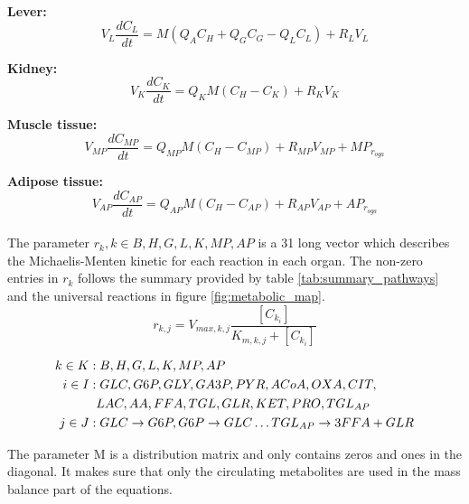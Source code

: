 \documentclass{IEEEtran}
\begin{document}
\textbf{Lever:}
\begin{equation}
    V_{L}  \frac{dC_{L}}{dt} = M (Q_{A} C_H + Q_{G} C_G - Q_{L} C_L) + R_L V_L
\end{equation}

\textbf{Kidney:}
\begin{equation}
    V_{K}  \frac{dC_{K}}{dt} = Q_{K} M (C_H - C_K) + R_K V_K
\end{equation}

\textbf{Muscle tissue:}
\begin{equation}
    V_{MP}  \frac{dC_{MP}}{dt} = Q_{MP} M (C_H - C_{MP}) + R_{ MP}V_{MP} + MP_{r_{oga}} 
\end{equation}

\textbf{Adipose tissue:}
\begin{equation}
    V_{AP}  \frac{dC_{AP}}{dt} = Q_{AP} M (C_H - C_{AP}) + R_{ AP}V_{AP} + AP_{r_{oga}} 
\end{equation} \\


The parameter $r_k , k \in {B,H,G,L,K,MP,AP}$ is a 31 long vector which describes the Michaelis-Menten kinetic for each reaction in each organ. The non-zero entries in $r_k$ follows the summary provided by table \ref{tab:summary_pathways} and the universal reactions in figure \ref{fig:metabolic_map}. \\

\begin{equation}
    r_{k,j} = V_{max,k,j} \frac{[C_{k_i}]}{K_{m,k,j}+[C_{k_i}]} 
\end{equation}


\begin{align*}
k \in K: &\hspace{1mm} B,H,G,L,K,MP,AP \\
i \in I: &\hspace{1mm} GLC,G6P,GLY,GA3P,PYR,ACoA,OXA,CIT, \\
        & LAC,AA,FFA,TGL,GLR,KET,PRO,TGL_{AP}     \\
j \in J: &\hspace{1mm}
GLC\rightarrow G6P, G6P\rightarrow GLC \ldots TGL_{AP} \rightarrow 3FFA + GLR 
\end{align*}


The parameter M is a distribution matrix and only contains zeros and ones in the diagonal. It makes sure that only the circulating metabolites are used in the mass balance part of the equations. \\
\end{document}
